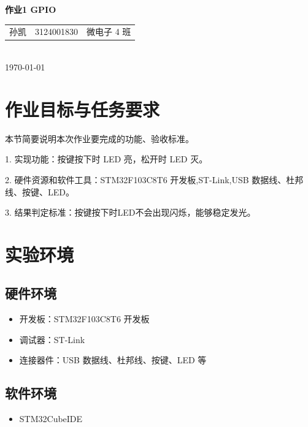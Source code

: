 \documentclass[12pt,a4paper]{ctexart}
\newcommand{\homeworkname}{作业1 GPIO}
\newcommand{\studentname}{孙凯}
\newcommand{\studentid}{3124001830}
\newcommand{\classname}{微电子 4 班}
\newcommand{\submitdate}{\today}
\begin{document}
\setcounter{tocdepth}{1}

\begin{center}
  {\bfseries \homeworkname \par}
  \vspace{0.8em}
  \begin{tabular}{ccc}
    \studentname & \studentid & \classname
  \end{tabular}
  \\
  \vspace{0.4em}
  \submitdate
\end{center}

\vspace{0.5em}
\tableofcontents
\vspace{0.8em}

\section{作业目标与任务要求}

本节简要说明本次作业要完成的功能、验收标准。

    1.  实现功能：按键按下时 LED 亮，松开时 LED 灭。
    
    2.  硬件资源和软件工具：STM32F103C8T6 开发板,ST-Link,USB 数据线、杜邦线、按键、LED。
    
    3.  结果判定标准：按键按下时LED不会出现闪烁，能够稳定发光。
    

\section{实验环境}

\subsection{硬件环境}

\begin{itemize}
  \item 开发板：STM32F103C8T6 开发板
  \item 调试器：ST-Link
  \item 连接器件：USB 数据线、杜邦线、按键、LED 等
\end{itemize}

\subsection{软件环境}

\begin{itemize}
  \item STM32CubeIDE
\end{itemize}
\end{document}
